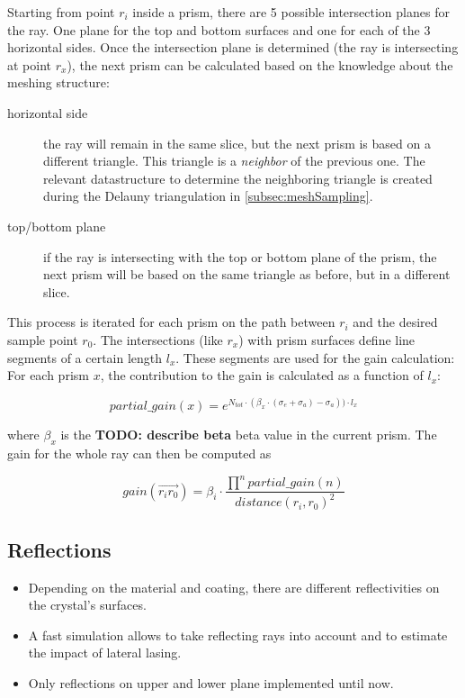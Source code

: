 Starting from point $r_i$ inside a prism, there are 5 possible intersection
planes for the ray. One plane for the top and bottom surfaces and one for each
of the 3 horizontal sides. Once the intersection plane is determined (the ray is
intersecting at point $r_x$), the next prism can be calculated based on the
knowledge about the meshing structure:

\begin{description}

  \item[horizontal side]
    the ray will remain in the same slice, but the next prism is based on a
    different triangle. This triangle is a \emph{neighbor} of the previous one.
    The relevant datastructure to determine the neighboring triangle is created
    during the Delauny triangulation in \ref{subsec:meshSampling}.

  \item[top/bottom plane]
    if the ray is intersecting with the top or bottom plane of the prism, the
    next prism will be based on the same triangle as before, but in a different
    slice.

\end{description}

This process is iterated for each prism on the path between $r_i$ and the
desired sample point $r_0$. The intersections (like $r_x$) with prism surfaces
define line segments of a certain length $l_x$. These segments are used for the
gain calculation: For each prism $x$, the contribution to the gain is calculated as
a function of $l_x$:

\[ 
  partial\_gain(x) = 
  e^{N_{tot} \cdot (\beta_x \cdot (\sigma_e + \sigma_a) - \sigma_a)) \cdot l_x}
\]

where $\beta_x$ is the \textbf{TODO: describe beta} beta value in the current
prism.
The gain for the whole ray can then be computed as

\[ 
  gain(\overrightarrow{r_ir_0}) =  \beta_i \cdot 
  \frac  { \prod^n partial\_gain(n) }{distance(r_i,r_0)^2 }
\]

\subsection{Reflections}

\begin{itemize}

  \item Depending on the material and coating, there are different
    reflectivities on the crystal's surfaces.

  \item A fast simulation allows to take reflecting rays into account and to
    estimate the impact of lateral lasing.

  \item Only reflections on upper and lower plane implemented until now.

\end{itemize}



